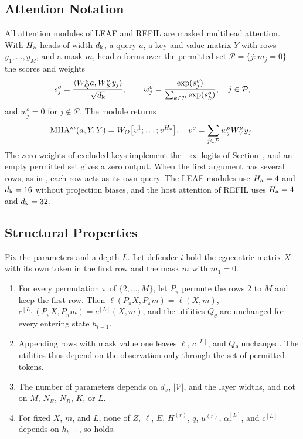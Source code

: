 \subsection{Attention Notation}
All attention modules of LEAF and REFIL are masked multihead attention. With $H_{\rm a}$ heads of width $d_{\rm k}$, a query $a$, a key and value matrix $Y$ with rows $y_1,\dots,y_M$, and a mask $m$, head $o$ forms over the permitted set $\mathcal P=\{j:m_j=0\}$ the scores and weights
\begin{equation}
s^{o}_{j}=\frac{\langle W^{o}_Qa,W^{o}_Ky_j\rangle}{\sqrt{d_{\rm k}}},\qquad
w^{o}_{j}=\frac{\exp(s^{o}_{j})}{\sum_{k\in\mathcal P}\exp(s^{o}_{k})},\quad j\in\mathcal P,
\label{eq:s-weights}
\end{equation}
and $w^{o}_{j}=0$ for $j\notin\mathcal P$. The module returns
\begin{equation}
\operatorname{MHA}^{m}(a,Y,Y)=W_O\big[v^{1};\dots;v^{H_{\rm a}}\big],\quad v^{o}=\sum_{j\in\mathcal P}w^{o}_{j}W^{o}_Vy_j.
\label{eq:s-mha}
\end{equation}
The zero weights of excluded keys implement the $-\infty$ logits of Section~, and an empty permitted set gives a zero output. When the first argument has several rows, as in , each row acts as its own query. The LEAF modules use $H_{\rm a}=4$ and $d_{\rm k}=16$ without projection biases, and the host attention of REFIL uses $H_{\rm a}=4$ and $d_{\rm k}=32$.

\subsection{Structural Properties}

\begin{lemma}
\label{lem:s-structure}
Fix the parameters and a depth $L$. Let defender $i$ hold the egocentric matrix $X$ with its own token in the first row and the mask $m$ with $m_1=0$.
\begin{enumerate}
\item[(a)] For every permutation $\pi$ of $\{2,\dots,M\}$, let $P_\pi$ permute the rows $2$ to $M$ and keep the first row. Then $\ell(P_\pi X,P_\pi m)=\ell(X,m)$, $c^{[L]}(P_\pi X,P_\pi m)=c^{[L]}(X,m)$, and the utilities $Q_\theta$ are unchanged for every entering state $h_{t-1}$.
\item[(b)] Appending rows with mask value one leaves $\ell$, $c^{[L]}$, and $Q_\theta$ unchanged. The utilities thus depend on the observation only through the set of permitted tokens.
\item[(c)] The number of parameters depends on $d_x$, $|\mathcal V|$, and the layer widths, and not on $M$, $N_R$, $N_B$, $K$, or $L$.
\item[(d)] For fixed $X$, $m$, and $L$, none of $Z$, $\ell$, $E$, $H^{(r)}$, $q$, $u^{(r)}$, $\alpha^{[L]}_r$, and $c^{[L]}$ depends on $h_{t-1}$, so  holds.
\end{enumerate}
\end{lemma}

